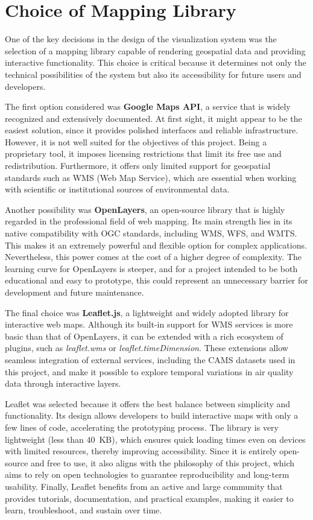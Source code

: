 \section{Choice of Mapping Library}

One of the key decisions in the design of the visualization system was the selection of a mapping library capable of rendering geospatial data and providing interactive functionality. This choice is critical because it determines not only the technical possibilities of the system but also its accessibility for future users and developers.  

The first option considered was \textbf{Google Maps API}, a service that is widely recognized and extensively documented. At first sight, it might appear to be the easiest solution, since it provides polished interfaces and reliable infrastructure. However, it is not well suited for the objectives of this project. Being a proprietary tool, it imposes licensing restrictions that limit its free use and redistribution. Furthermore, it offers only limited support for geospatial standards such as WMS (Web Map Service), which are essential when working with scientific or institutional sources of environmental data.  

Another possibility was \textbf{OpenLayers}, an open-source library that is highly regarded in the professional field of web mapping. Its main strength lies in its native compatibility with OGC standards, including WMS, WFS, and WMTS. This makes it an extremely powerful and flexible option for complex applications. Nevertheless, this power comes at the cost of a higher degree of complexity. The learning curve for OpenLayers is steeper, and for a project intended to be both educational and easy to prototype, this could represent an unnecessary barrier for development and future maintenance.  

The final choice was \textbf{Leaflet.js}, a lightweight and widely adopted library for interactive web maps. Although its built-in support for WMS services is more basic than that of OpenLayers, it can be extended with a rich ecosystem of plugins, such as \textit{leaflet.wms} or \textit{leaflet.timeDimension}. These extensions allow seamless integration of external services, including the CAMS datasets used in this project, and make it possible to explore temporal variations in air quality data through interactive layers.  

Leaflet was selected because it offers the best balance between simplicity and functionality. Its design allows developers to build interactive maps with only a few lines of code, accelerating the prototyping process. The library is very lightweight (less than 40~KB), which ensures quick loading times even on devices with limited resources, thereby improving accessibility. Since it is entirely open-source and free to use, it also aligns with the philosophy of this project, which aims to rely on open technologies to guarantee reproducibility and long-term usability. Finally, Leaflet benefits from an active and large community that provides tutorials, documentation, and practical examples, making it easier to learn, troubleshoot, and sustain over time.  

